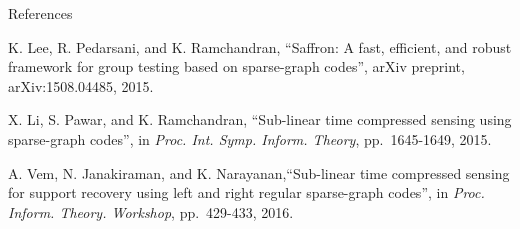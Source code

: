 \documentclass[final]{beamer}
\newlength{\threecolwid}
\begin{document}
\begin{frame}
\begin{columns}[t]
\begin{column}{\threecolwid}
    \vspace{2.5cm}
    \begin{block}{References}
      \begin{thebibliography}{10}

K. Lee, R. Pedarsani, and K. Ramchandran, ``Saffron: A fast, efficient, and robust framework for group testing based on sparse-graph codes'', arXiv preprint, arXiv:1508.04485, 2015.

X. Li, S. Pawar, and K. Ramchandran, ``Sub-linear time compressed sensing using sparse-graph codes'', in \emph{Proc. Int. Symp. Inform. Theory},
  pp.~1645-1649, 2015.
  
A. Vem, N. Janakiraman, and K. Narayanan,``Sub-linear time compressed sensing for support recovery using left and right regular sparse-graph codes'', in \emph{Proc. Inform. Theory. Workshop}, pp.~429-433, 2016.
 \end{thebibliography}
	  \end{block}

  \end{column}
  
\end{columns}
\end{frame}
\end{document}
